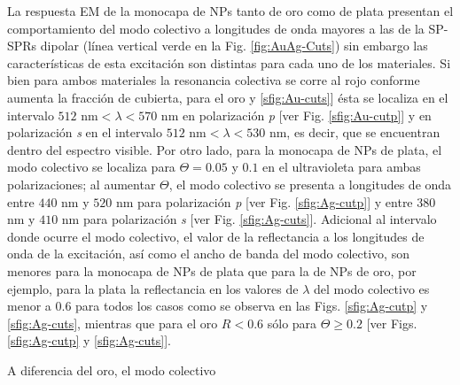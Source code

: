 La respuesta EM de la monocapa de NPs tanto de oro como de plata presentan el comportamiento del modo colectivo a longitudes de onda mayores a las de la SP-SPRs dipolar (línea vertical verde en la Fig. \ref{fig:AuAg-Cuts}) sin embargo las características de esta excitación son distintas para cada uno de los materiales. Si bien para ambos materiales la resonancia colectiva se corre al rojo conforme aumenta la fracción de cubierta, para el oro  y \ref{sfig:Au-cuts}] ésta se localiza en el intervalo $512$ nm$<\lambda<570$ nm en polarización \emph{p} [ver Fig. \ref{sfig:Au-cutp}] y  en polarización \emph{s} en el intervalo  $512$ nm$<\lambda<530$ nm, es decir, que se encuentran dentro del espectro visible. Por otro lado, para la monocapa de NPs de plata, el modo colectivo se localiza para $\Theta = 0.05$ y $0.1$ en el ultravioleta para ambas polarizaciones; al aumentar $\Theta$, el modo colectivo se presenta a longitudes de onda entre $440$ nm y $520$ nm para polarización \emph{p} [ver Fig. \ref{sfig:Ag-cutp}] y entre $380$ nm y $410$ nm para polarización \emph{s} [ver Fig. \ref{sfig:Ag-cuts}]. Adicional al intervalo donde ocurre el modo colectivo, el valor de la reflectancia a los longitudes de onda de la excitación, así como el ancho de banda del modo colectivo, son menores para la monocapa de NPs de plata que para la de NPs de oro, por ejemplo, para la plata la reflectancia en los valores de $\lambda$ del modo colectivo es menor a $0.6$ para todos los casos como se observa en las Figs. \ref{sfig:Ag-cutp} y \ref{sfig:Ag-cuts}, mientras que para el oro $R<0.6$ sólo para $\Theta\geq 0.2$ [ver Figs. \ref{sfig:Ag-cutp} y \ref{sfig:Ag-cuts}].



 A diferencia del oro, el modo colectivo 



























